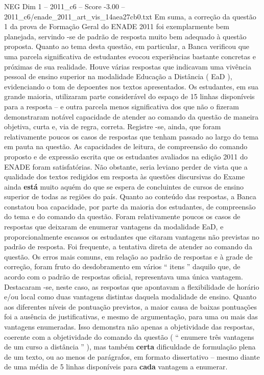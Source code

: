 \begin{textsample}{NEG Dim 1 – 2011\_c6 – Score -3.00 – 2011\_c6/enade\_2011\_art\_vis\_14aea27cb0.txt}
Em suma, a correção da questão 1 da prova de Formação Geral do ENADE 2011 foi exemplarmente bem planejada, servindo -se de padrão de resposta muito bem adequado à questão proposta.
Quanto ao tema desta questão, em particular, a Banca verificou que uma parcela significativa de estudantes evocou experiências bastante concretas e próximas de sua realidade.
Houve várias respostas que indicavam uma vivência pessoal de ensino superior na modalidade Educação a Distância ( EaD ), evidenciando o tom de depoentes nos textos apresentados.
Os estudantes, em sua grande maioria, utilizaram parte considerável do espaço de 15 linhas disponíveis para a resposta – e outra parcela menos significativa dos que não o fizeram demonstraram notável capacidade de atender ao comando da questão de maneira objetiva, curta e, via de regra, correta.
Registre -se, ainda, que foram relativamente poucos os casos de respostas que tenham passado ao largo do tema em pauta na questão.
As capacidades de leitura, de compreensão do comando proposto e de expressão escrita que os estudantes avaliados na edição 2011 do ENADE foram satisfatórias.
Não obstante, seria leviano perder de vista que a qualidade dos textos redigidos em resposta às questões discursivas do Exame ainda \textbf{está} muito aquém do que se espera de concluintes de cursos de ensino superior de todas as regiões do país.
Quanto ao conteúdo das respostas, a Banca constatou boa capacidade, por parte da maioria dos estudantes, de compreensão do tema e do comando da questão.
Foram relativamente poucos os casos de respostas que deixaram de enumerar vantagens da modalidade EaD, e proporcionalmente escassos os estudantes que citaram vantagens não previstas no padrão de resposta.
Foi frequente, a tentativa direta de atender ao comando da questão.
Os erros mais comuns, em relação ao padrão de respostas e à grade de correção, foram fruto do desdobramento em vários “ itens ” daquilo que, de acordo com o padrão de respostas oficial, representava uma única vantagem.
Destacaram -se, neste caso, as respostas que apontavam a flexibilidade de horário e/ou local como duas vantagens distintas daquela modalidade de ensino.
Quanto aos diferentes níveis de pontuação previstos, a maior causa de baixas pontuações foi a ausência de justificativas, e mesmo de argumentação, para uma ou mais das vantagens enumeradas.
Isso demonstra não apenas a objetividade das respostas, coerente com a objetividade do comando da questão ( “ enumere três vantagens de um curso a distância ” ), mas também \textbf{certa} dificuldade de formulação plena de um texto, ou ao menos de parágrafos, em formato dissertativo – mesmo diante de uma média de 5 linhas disponíveis para \textbf{cada} vantagem a enumerar.

\end{textsample}
